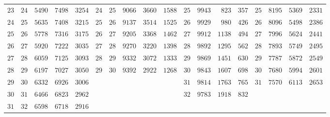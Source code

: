 \begin{center}
\begin{tabular}{rr|r|r|r||rr|r|r|r||r|r|r|r||r|r|r|r}
$23$ & $24$ & $5490$ & $7498$ & $3254$ & $24$ & $25$ & $9066$ & $3660$ & $1588$ & $25$ & $9943$ & $823$ & $357$ & $25$ & $8195$ & $5369$ & $2331$\\[3pt]
$24$ & $25$ & $5635$ & $7408$ & $3215$ & $25$ & $26$ & $9137$ & $3514$ & $1525$ & $26$ & $9929$ & $980$ & $426$ & $26$ & $8096$ & $5498$ & $2386$\\
$25$ & $26$ & $5778$ & $7316$ & $3175$ & $26$ & $27$ & $9205$ & $3368$ & $1462$ & $27$ & $9912$ & $1138$ & $494$ & $27$ & $7996$ & $5624$ & $2441$\\
$26$ & $27$ & $5920$ & $7222$ & $3035$ & $27$ & $28$ & $9270$ & $3220$ & $1398$ & $28$ & $9892$ & $1295$ & $562$ & $28$ & $7893$ & $5749$ & $2495$\\
$27$ & $28$ & $6059$ & $7125$ & $3093$ & $28$ & $29$ & $9332$ & $3072$ & $1333$ & $29$ & $9869$ & $1451$ & $630$ & $29$ & $7787$ & $5872$ & $2549$\\
$28$ & $29$ & $6197$ & $7027$ & $3050$ & $29$ & $30$ & $9392$ & $2922$ & $1268$ & $30$ & $9843$ & $1607$ & $698$ & $30$ & $7680$ & $5994$ & $2601$\\[3pt]
$29$ & $30$ & $6332$ & $6926$ & $3006$ &  &  &  &  &  & $31$ & $9814$ & $1763$ & $765$ & $31$ & $7570$ & $6113$ & $2653$\\
$30$ & $31$ & $6466$ & $6823$ & $2962$ &  &  &  &  &  & $32$ & $9783$ & $1918$ & $832$ &  &  &  & \\
$31$ & $32$ & $6598$ & $6718$ & $2916$ &  &  &  &  &  &  &  &  &  &  &  &  & \\
\end{tabular}\endgroup
\end{center}
\clearpage
{}%
